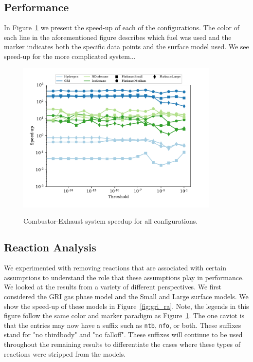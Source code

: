 \documentclass{article}
\newcommand{\sectionTwo}[1]{\subsection{#1} \addvspace{10pt}}
\begin{document}
\sectionTwo{Performance}

In Figure~\ref{fig:nce-perf} we present the speed-up of each of the configurations.
The color of each line in the aforementioned figure describes which fuel was used and the marker indicates both the specific data points and the surface model used.
We see speed-up for the more complicated system...
\begin{figure}[htb]
    \begin{center}
        \includegraphics[width=0.9\textwidth]{figures/nce-all-models.pdf}
        \label{fig:nce-perf}
        \caption{Combustor-Exhaust system speedup for all configurations.}
    \end{center}
\end{figure}

\sectionTwo{Reaction Analysis}

We experimented with removing reactions that are associated with certain assumptions to understand the role that these assumptions play in performance.
We looked at the results from a variety of different perspectives.
We first considered the GRI gas phase model\cite{smith_gri-mech_1999} and the Small\cite{deutschmann1996numerical} and Large\cite{kreitz2022detailed} surface models.
We show the speed-up of these models in Figure~\ref{fig:gri_ra}.
Note, the legends in this figure follow the same color and marker paradigm as Figure~\ref{fig:nce-perf}.
The one caviot is that the entries may now have a suffix such as \texttt{ntb}, \texttt{nfo}, or both. These suffixes stand for "no thirdbody" and "no falloff".
These suffixes will continue to be used throughout the remaining results to differentiate the cases where these types of reactions were stripped from the models.
\end{document}
